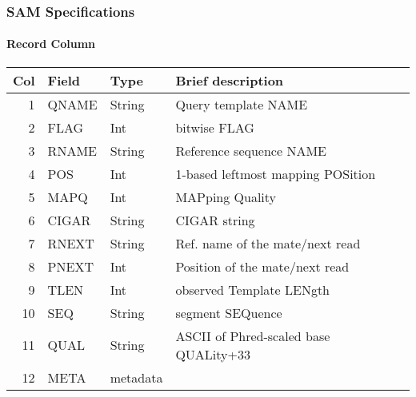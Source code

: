 \documentclass[xcolor=table]{beamer}
\begin{document}
\begin{frame}[fragile]
\frametitle{SAM Specifications}
\framesubtitle{Record Column}
\begin{center}
\small
\begin{tabular}{rlll}
  \hline
  {\bf Col} & {\bf Field} & {\bf Type} & {\bf Brief description} \\
  \hline
  1 & {\sf QNAME} & String & Query template NAME\\
  2 & {\sf FLAG} & Int & bitwise FLAG \\
  3 & {\sf RNAME} & String & Reference sequence NAME\\
  4 & {\sf POS} & Int & 1-based leftmost mapping POSition \\
  5 & {\sf MAPQ} & Int & MAPping Quality \\
  6 & {\sf CIGAR} & String & CIGAR string \\
  7 & {\sf RNEXT} & String & Ref. name of the mate/next read\\
  8 & {\sf PNEXT} & Int & Position of the mate/next read \\
  9 & {\sf TLEN} & Int & observed Template LENgth \\
  10 & {\sf SEQ} & String & segment SEQuence\\
  11 & {\sf QUAL} & String & ASCII of Phred-scaled base QUALity+33 \\
  12 & {\sf META} & metadata \\
  \hline
\end{tabular}
\end{center}
\end{frame}
\end{document}
